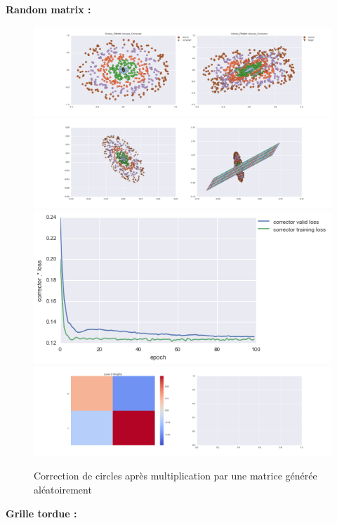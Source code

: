 {\Large \textbf{Random matrix :}}

\begin{figure}[H] %
\centering
\includegraphics[width=\linewidth]{fig/24-05-2016/circles/Circles_RMatK-closest_Corrector-DATA.png}
\includegraphics[width=\linewidth]{fig/24-05-2016/circles/Circles_RMatK-closest_Corrector-GridCheck.png}
\includegraphics[width=0.45\linewidth]{fig/24-05-2016/circles/Circles_RMatK-closest_Corrector-Learning_curve.png}
\includegraphics[width=\linewidth]{fig/24-05-2016/circles/Circles_RMatK-closest_Corrector-W.png}
\caption{Correction de circles après multiplication par une matrice générée aléatoirement}
\label{fig:recap-circles-RMat-exhaustive}
\end{figure}

{\Large \textbf{Grille tordue :}}

